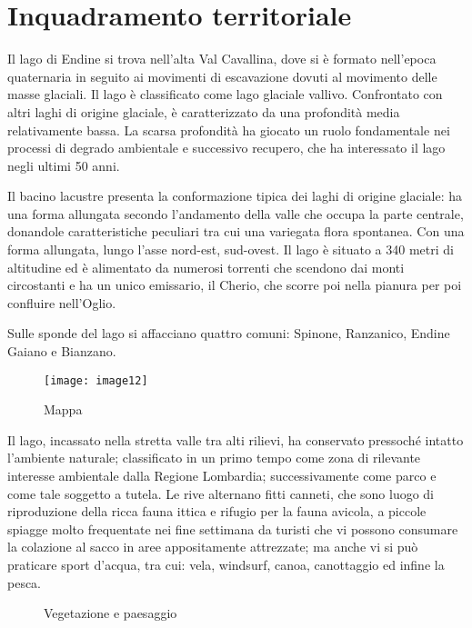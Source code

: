 \section{Inquadramento territoriale}

Il lago di Endine si trova nell'alta Val Cavallina, dove si è formato nell'epoca quaternaria in seguito ai movimenti di escavazione dovuti al movimento delle masse glaciali. Il lago è classificato come lago glaciale vallivo. Confrontato con altri laghi di origine glaciale, è caratterizzato da una profondità media relativamente bassa.
La scarsa profondità ha giocato un ruolo fondamentale nei processi di degrado ambientale e successivo recupero, che ha interessato il lago negli ultimi 50 anni. 

Il bacino lacustre presenta la conformazione tipica dei laghi di origine glaciale: ha una forma allungata secondo l’andamento della valle che occupa la parte centrale, donandole caratteristiche peculiari tra cui una variegata flora spontanea. 
Con una forma allungata, lungo l’asse nord-est, sud-ovest. Il lago è situato a 340 metri di altitudine ed è alimentato da numerosi torrenti che scendono dai monti circostanti e ha un unico emissario, il Cherio, che scorre poi nella pianura per poi confluire nell'Oglio.

Sulle sponde del lago si affacciano quattro comuni: Spinone, Ranzanico, Endine Gaiano e Bianzano.

\begin{figure}[H]
	\centering
	\texttt{[image: image12]}
	\caption{Mappa}
	\label{fig:mesh1}
\end{figure}

Il lago, incassato nella stretta valle tra alti rilievi, ha conservato pressoché intatto l'ambiente naturale; classificato in un primo tempo come zona di rilevante interesse ambientale dalla Regione Lombardia; successivamente come parco e come tale soggetto a tutela. Le rive alternano fitti canneti, che sono luogo di riproduzione della ricca fauna ittica e rifugio per la fauna avicola, a piccole spiagge molto frequentate nei fine settimana da turisti che vi possono consumare la colazione al sacco in aree appositamente attrezzate; ma anche vi si può praticare  sport d'acqua, tra cui: vela, windsurf, canoa, canottaggio ed infine la pesca.

\begin{figure}[H]
	\captionsetup[subfloat]{farskip=2pt,captionskip=8pt}
	\centering
	\hspace{1cm}
	\caption{Vegetazione e paesaggio}
	\label{fig:fotolago}
\end{figure}

